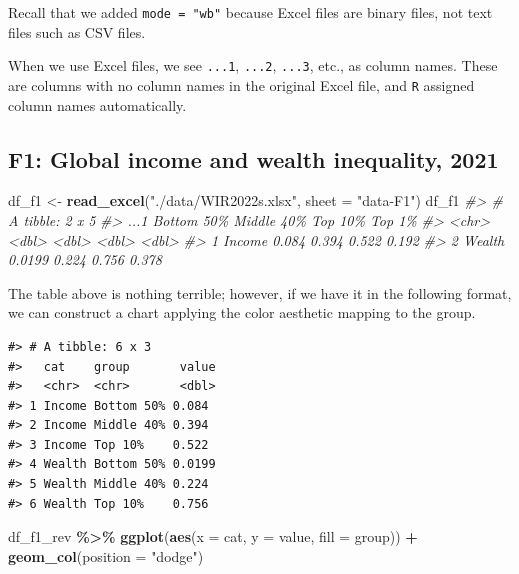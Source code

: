 \documentclass[
  xelatex, ja=standard]{bxjsbook}
\newenvironment{Shaded}{\begin{snugshade}}{\end{snugshade}}
\newcommand{\AttributeTok}[1]{\textcolor[rgb]{0.13,0.29,0.53}{#1}}
\newcommand{\CommentTok}[1]{\textcolor[rgb]{0.56,0.35,0.01}{\textit{#1}}}
\newcommand{\FunctionTok}[1]{\textcolor[rgb]{0.13,0.29,0.53}{\textbf{#1}}}
\newcommand{\NormalTok}[1]{#1}
\newcommand{\OtherTok}[1]{\textcolor[rgb]{0.56,0.35,0.01}{#1}}
\newcommand{\SpecialCharTok}[1]{\textcolor[rgb]{0.81,0.36,0.00}{\textbf{#1}}}
\newcommand{\StringTok}[1]{\textcolor[rgb]{0.31,0.60,0.02}{#1}}
\theoremstyle{definition}
\theoremstyle{definition}
\theoremstyle{definition}
\theoremstyle{definition}
\theoremstyle{remark}
\begin{document}
Recall that we added \texttt{mode\ =\ "wb"} because Excel files are binary files, not text files such as CSV files.

When we use Excel files, we see \texttt{...1}, \texttt{...2}, \texttt{...3}, etc., as column names. These are columns with no column names in the original Excel file, and \texttt{R} assigned column names automatically.

\hypertarget{f1-global-income-and-wealth-inequality-2021}{%
\subsection{F1: Global income and wealth inequality, 2021}\label{f1-global-income-and-wealth-inequality-2021}}

\begin{Shaded}
\begin{Highlighting}[]
\NormalTok{df\_f1 }\OtherTok{\textless{}{-}} \FunctionTok{read\_excel}\NormalTok{(}\StringTok{"./data/WIR2022s.xlsx"}\NormalTok{, }\AttributeTok{sheet =} \StringTok{"data{-}F1"}\NormalTok{)}
\NormalTok{df\_f1}
\CommentTok{\#\textgreater{} \# A tibble: 2 x 5}
\CommentTok{\#\textgreater{}   ...1   \textasciigrave{}Bottom 50\%\textasciigrave{} \textasciigrave{}Middle 40\%\textasciigrave{} \textasciigrave{}Top 10\%\textasciigrave{} \textasciigrave{}Top 1\%\textasciigrave{}}
\CommentTok{\#\textgreater{}   \textless{}chr\textgreater{}         \textless{}dbl\textgreater{}        \textless{}dbl\textgreater{}     \textless{}dbl\textgreater{}    \textless{}dbl\textgreater{}}
\CommentTok{\#\textgreater{} 1 Income       0.084         0.394     0.522    0.192}
\CommentTok{\#\textgreater{} 2 Wealth       0.0199        0.224     0.756    0.378}
\end{Highlighting}
\end{Shaded}

The table above is nothing terrible; however, if we have it in the following format, we can construct a chart applying the color aesthetic mapping to the group.

\begin{verbatim}
#> # A tibble: 6 x 3
#>   cat    group       value
#>   <chr>  <chr>       <dbl>
#> 1 Income Bottom 50% 0.084 
#> 2 Income Middle 40% 0.394 
#> 3 Income Top 10%    0.522 
#> 4 Wealth Bottom 50% 0.0199
#> 5 Wealth Middle 40% 0.224 
#> 6 Wealth Top 10%    0.756
\end{verbatim}

\begin{Shaded}
\begin{Highlighting}[]
\NormalTok{df\_f1\_rev }\SpecialCharTok{\%\textgreater{}\%}
  \FunctionTok{ggplot}\NormalTok{(}\FunctionTok{aes}\NormalTok{(}\AttributeTok{x =}\NormalTok{ cat, }\AttributeTok{y =}\NormalTok{ value, }\AttributeTok{fill =}\NormalTok{ group)) }\SpecialCharTok{+}
  \FunctionTok{geom\_col}\NormalTok{(}\AttributeTok{position =} \StringTok{"dodge"}\NormalTok{)}
\end{Highlighting}
\end{Shaded}
\end{document}
